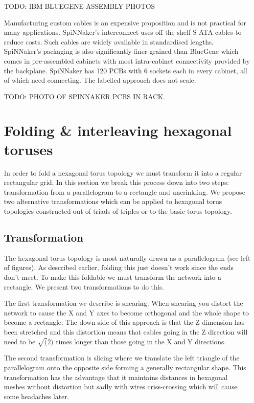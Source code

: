 			TODO: IBM BLUEGENE ASSEMBLY PHOTOS
			
			Manufacturing custom cables is an expensive proposition and is not
			practical for many applications. SpiNNaker's interconnect uses
			off-the-shelf S-ATA cables to reduce costs. Such cables are widely
			available in standardised lengths. SpiNNaker's packaging is also
			significantly finer-grained than BlueGene which comes in pre-assembled
			cabinets with most intra-cabinet connectivity provided by the backplane.
			SpiNNaker has 120 PCBs with 6 sockets each in every cabinet, all of which
			need connecting. The labelled approach does not scale.
			
			TODO: PHOTO OF SPINNAKER PCBS IN RACK.
	
	\section{Folding \& interleaving hexagonal toruses}
		
		In order to fold a hexagonal torus topology we must transform it into a
		regular rectangular grid. In this section we break this process down into
		two steps: transformation from a parallelogram to a rectangle and
		uncrinkling. We propose two alternative transformations which can be
		applied to hexagonal torus topologies constructed out of triads of triples
		or to the basic torus topology.
		
		\subsection{Transformation}
			
			The hexagonal torus topology is most naturally drawn as a parallelogram
			(see left of figures). As described earlier, folding this just doesn't
			work since the ends don't meet. To make this foldable we must transform
			the network into a rectangle. We present two transformations to do this.
			
			The first transformation we describe is shearing. When shearing you
			distort the network to cause the X and Y axes to become orthogonal and
			the whole shape to become a rectangle. The down-side of this approach is
			that the Z dimension has been stretched and this distortion means that
			cables going in the Z direction will need to be $\sqrt(2)$ times longer
			than those going in the X and Y directions.
			
			The second transformation is slicing where we translate the left triangle
			of the parallelogram onto the opposite side forming a generally
			rectangular shape. This transformation has the advantage that it
			maintains distances in hexagonal meshes without distortion but sadly with
			wires criss-crossing which will cause some headaches later.
			
